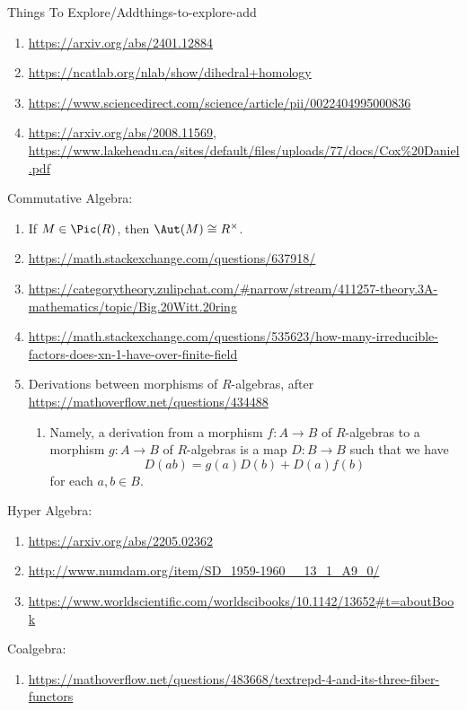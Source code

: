 \begin{remark}{Things To Explore/Add}{things-to-explore-add}
\begin{enumerate}
        \item \url{https://arxiv.org/abs/2401.12884}
        \item \url{https://ncatlab.org/nlab/show/dihedral+homology}
        \item \url{https://www.sciencedirect.com/science/article/pii/0022404995000836}
        \item \url{https://arxiv.org/abs/2008.11569}, \url{https://www.lakeheadu.ca/sites/default/files/uploads/77/docs/Cox\%20Daniel.pdf}
    \end{enumerate}
    Commutative Algebra:
    \begin{enumerate}
        \item If $M\in\Pic(R)$, then $\Aut(M)\cong R^{\times}$.
        \item \url{https://math.stackexchange.com/questions/637918/}
        \item \url{https://categorytheory.zulipchat.com/#narrow/stream/411257-theory.3A-mathematics/topic/Big.20Witt.20ring}
        \item \url{https://math.stackexchange.com/questions/535623/how-many-irreducible-factors-does-xn-1-have-over-finite-field}
        \item Derivations between morphisms of $R$-algebras, after \url{https://mathoverflow.net/questions/434488}
            \begin{enumerate}
                \item Namely, a derivation from a morphism $f\colon A\to B$ of $R$-algebras to a morphism $g\colon A\to B$ of $R$-algebras is a map $D\colon B\to B$ such that we have
                    \[
                        D(ab)%
                        =%
                        g(a)D(b)%
                        +%
                        D(a)f(b)%
                    \]%
                    for each $a,b\in B$.
            \end{enumerate}
    \end{enumerate}
    Hyper Algebra:
    \begin{enumerate}
        \item \url{https://arxiv.org/abs/2205.02362}
        \item \url{http://www.numdam.org/item/SD_1959-1960__13_1_A9_0/}
        \item \url{https://www.worldscientific.com/worldscibooks/10.1142/13652#t=aboutBook}
    \end{enumerate}
    Coalgebra:
    \begin{enumerate}
        \item \url{https://mathoverflow.net/questions/483668/textrepd-4-and-its-three-fiber-functors}

\end{enumerate}
\end{remark}
